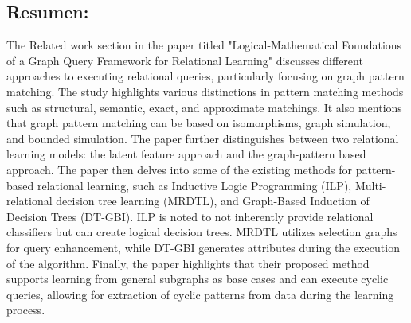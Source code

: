\documentclass{article}%
\begin{document}
%
\subsection{Resumen:}%
\label{subsec:Resumen}%
The Related work section in the paper titled "Logical{-}Mathematical Foundations of a Graph Query Framework for Relational Learning" discusses different approaches to executing relational queries, particularly focusing on graph pattern matching. The study highlights various distinctions in pattern matching methods such as structural, semantic, exact, and approximate matchings. It also mentions that graph pattern matching can be based on isomorphisms, graph simulation, and bounded simulation. The paper further distinguishes between two relational learning models: the latent feature approach and the graph{-}pattern based approach.\newline%
\newline%
The paper then delves into some of the existing methods for pattern{-}based relational learning, such as Inductive Logic Programming (ILP), Multi{-}relational decision tree learning (MRDTL), and Graph{-}Based Induction of Decision Trees (DT{-}GBI). ILP is noted to not inherently provide relational classifiers but can create logical decision trees. MRDTL utilizes selection graphs for query enhancement, while DT{-}GBI generates attributes during the execution of the algorithm.\newline%
\newline%
Finally, the paper highlights that their proposed method supports learning from general subgraphs as base cases and can execute cyclic queries, allowing for extraction of cyclic patterns from data during the learning process.

%
\end{document}
